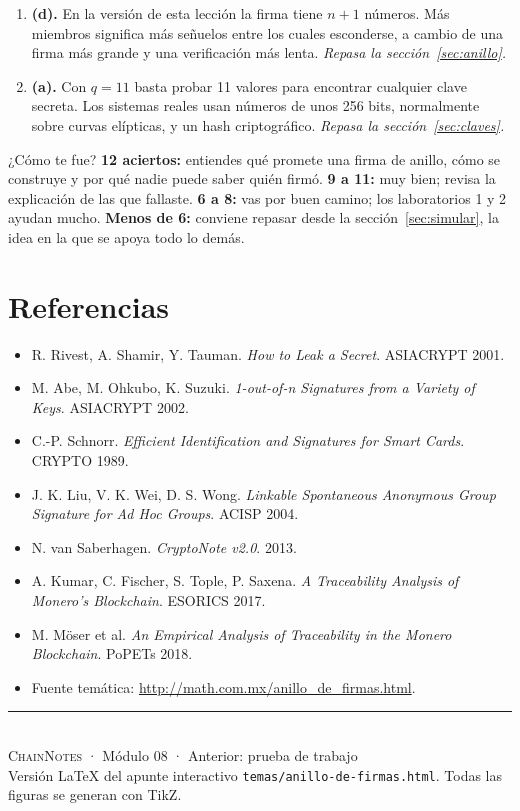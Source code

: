 \documentclass[11pt,a4paper]{article}
\theoremstyle{definition}
\theoremstyle{plain}
\theoremstyle{remark}
\begin{document}
\begin{enumerate}[leftmargin=2em,itemsep=0.6em,label=\textbf{\arabic*.}]
  no indica cuál miembro del anillo es. Si aparece dos veces, la red rechaza el
  segundo gasto. \emph{Repasa la sección~\ref{sec:blockchain}.}
\item \textbf{(d).} En la versión de esta lección la firma tiene $n + 1$ números. Más
  miembros significa más señuelos entre los cuales esconderse, a cambio de una firma
  más grande y una verificación más lenta. \emph{Repasa la sección~\ref{sec:anillo}.}
\item \textbf{(a).} Con $q = 11$ basta probar 11 valores para encontrar cualquier
  clave secreta. Los sistemas reales usan números de unos 256 bits, normalmente sobre
  curvas elípticas, y un hash criptográfico. \emph{Repasa la sección~\ref{sec:claves}.}
\end{enumerate}

\begin{nota}{¿Cómo te fue?}
\textbf{12 aciertos:} entiendes qué promete una firma de anillo, cómo se construye y
por qué nadie puede saber quién firmó. \textbf{9 a 11:} muy bien; revisa la
explicación de las que fallaste. \textbf{6 a 8:} vas por buen camino; los
laboratorios 1 y 2 ayudan mucho. \textbf{Menos de 6:} conviene repasar desde la
sección~\ref{sec:simular}, la idea en la que se apoya todo lo demás.
\end{nota}

\section*{Referencias}

\begin{itemize}[leftmargin=1.4em,itemsep=0.25em]
  \item R. Rivest, A. Shamir, Y. Tauman. \emph{How to Leak a Secret}. ASIACRYPT 2001.
  \item M. Abe, M. Ohkubo, K. Suzuki. \emph{1-out-of-n Signatures from a Variety of Keys}.
    ASIACRYPT 2002.
  \item C.-P. Schnorr. \emph{Efficient Identification and Signatures for Smart Cards}.
    CRYPTO 1989.
  \item J. K. Liu, V. K. Wei, D. S. Wong. \emph{Linkable Spontaneous Anonymous Group
    Signature for Ad Hoc Groups}. ACISP 2004.
  \item N. van Saberhagen. \emph{CryptoNote v2.0}. 2013.
  \item A. Kumar, C. Fischer, S. Tople, P. Saxena. \emph{A Traceability Analysis of
    Monero's Blockchain}. ESORICS 2017.
  \item M. Möser et al. \emph{An Empirical Analysis of Traceability in the Monero
    Blockchain}. PoPETs 2018.
  \item Fuente temática: \url{http://math.com.mx/anillo_de_firmas.html}.
\end{itemize}

\vfill
\begin{center}
\color{inkc}\small
\rule{0.35\textwidth}{0.4pt}\\[0.6em]
\textsc{ChainNotes} · Módulo 08 · Anterior: prueba de trabajo\\
{\footnotesize Versión LaTeX del apunte interactivo \texttt{temas/anillo-de-firmas.html}.
Todas las figuras se generan con TikZ.}
\end{center}
\end{document}
